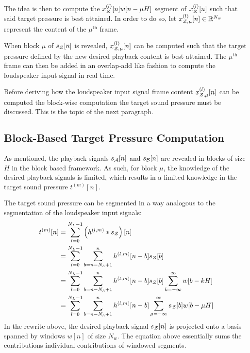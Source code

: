 The idea is then to compute the $x^{(l)}_{\mathcal{Z}}[n] w[n - \mu H]$ segment of $x^{(l)}_{\mathcal{Z}}[n]$ such that said target pressure is best attained.
In order to do so, let $x^{(l)}_{\mathcal{Z},\mu}[n]\in\mathbb{R}^{N_w}$ represent the content of the $\mu^\text{th}$ frame.  

When block $\mu$ of $s_{\mathcal{Z}}[n]$ is revealed, $x^{(l)}_{\mathcal{Z},\mu}[n]$ can be computed such that the target pressure defined by the new desired playback content is best attained.
The $\mu^\text{th}$ frame can then be added in an overlap-add like fashion to compute the loudspeaker input signal in real-time.

Before deriving how the loudspeaker input signal frame content $x^{(l)}_{\mathcal{Z},\mu}[n]$ can be computed 
the block-wise computation the target sound pressure must be discussed.
This is the topic of the next paragraph.

\subsection{Block-Based Target Pressure Computation}
As mentioned, the playback signals $s_{\mathcal{A}}[n]$ and $s_{\mathcal{B}}[n]$ are revealed in blocks of size $H$ in the block based framework.
As such, for block $\mu$, the knowledge of the desired playback signals is limited, which results in a limited knowledge in the target sound pressure $t^{(m)}[n]$.

The target sound pressure can be segmented in a way analogous to the segmentation of the loudspeaker input signals:
\begin{align}
    t^{(m)}[n] &= \sum_{l=0}^{N_L - 1} \left(h^{(l,m)} \ast s_{\mathcal{Z}}\right)[n] \\
               &= \sum_{l=0}^{N_L - 1} \sum_{b = n - N_h + 1}^{n} h^{(l,m)}[n - b] s_{\mathcal{Z}}[b] \\
               &= \sum_{l=0}^{N_L - 1} \sum_{b = n - N_h + 1}^{n} h^{(l,m)}[n - b] s_{\mathcal{Z}}[b] \sum_{k=-\infty}^{\infty} w[b - kH] \\
               &= \sum_{l=0}^{N_L - 1} \sum_{b = n - N_h + 1}^{n} h^{(l,m)}[n - b] \sum_{\mu =-\infty}^{\infty} s_{\mathcal{Z}}[b] w[b - \mu H] \\
\end{align}
In the rewrite above, the desired playback signal $s_{\mathcal{Z}}[n]$ is projected onto a basis spanned by windows $w[n]$ of size $N_w$. 
The equation above essentially sums the contributions individual contributions of windowed segments.

